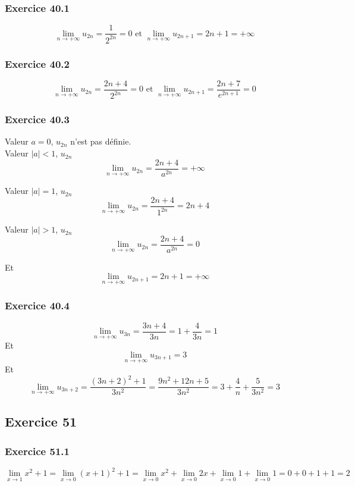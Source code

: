 \documentclass[]{book}
\theoremstyle{definition}
\begin{document}
\subsubsection*{Exercice 40.1}
$$\lim_{n \to +\infty}u_{2n} = \frac{1}{2^{2n}} = 0 \textrm{  et  } \lim_{n \to +\infty}u_{2n+1} = 2n+1 = +\infty$$ 

\subsubsection*{Exercice 40.2}
$$\lim_{n \to +\infty}u_{2n} = \frac{2n+4}{2^{2n}} = 0 \textrm{  et  } \lim_{n \to +\infty}u_{2n+1} = \frac{2n+7}{e^{2n+1}} = 0$$ 

\subsubsection*{Exercice 40.3}
Valeur $a=0$, $u_{2n}$ n'est pas d\'efinie.\\

Valeur $|a|<1$, $u_{2n}$\\
$$\lim_{n \to +\infty}u_{2n} = \frac{2n+4}{a^{2n}} = +\infty$$

Valeur $|a|=1$, $u_{2n}$\\
$$\lim_{n \to +\infty}u_{2n} = \frac{2n+4}{1^{2n}} = 2n+4$$

Valeur $|a|>1$, $u_{2n}$\\
$$\lim_{n \to +\infty}u_{2n} = \frac{2n+4}{a^{2n}} = 0$$

Et
$$ \lim_{n \to +\infty}u_{2n+1} = 2n+1 = +\infty$$ 

\subsubsection*{Exercice 40.4}
$$ \lim_{n \to +\infty}u_{3n} = \frac{3n+4}{3n} = 1+\frac{4}{3n} = 1$$ 
Et
$$ \lim_{n \to +\infty}u_{3n+1} = 3$$ 
Et
$$ \lim_{n \to +\infty}u_{3n+2} = \frac{(3n+2)^2+1}{3n^2} = \frac{9n^2+12n+5}{3n^2} = 3+\frac{4}{n}+\frac{5}{3n^2} = 3$$ 



\subsection*{Exercice 51}
\subsubsection*{Exercice 51.1}
$$\lim_{x\to1}x^2+1 = \lim_{x\to0} (x+1)^2+1 = \lim_{x\to0}x^2 + \lim_{x\to0}2x + \lim_{x\to0}1 + \lim_{x\to0}1 = 0+0+1+1 = 2$$
\end{document}
